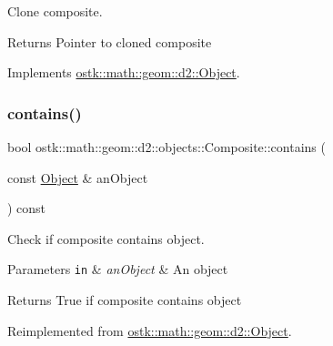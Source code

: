 Clone composite. 

\begin{DoxyReturn}{Returns}
Pointer to cloned composite 
\end{DoxyReturn}


Implements \hyperlink{classostk_1_1math_1_1geom_1_1d2_1_1_object_a98dedc6792aef35308966ca768eb3e14}{ostk\+::math\+::geom\+::d2\+::\+Object}.

\mbox{\label{classostk_1_1math_1_1geom_1_1d2_1_1objects_1_1_composite_a4a07c3111b7ca79b2e0d5ec2d52b2ef1}} 
\subsubsection{\texorpdfstring{contains()}{contains()}\hspace{0.1cm}{\footnotesize\ttfamily [1/2]}}
{\footnotesize\ttfamily bool ostk\+::math\+::geom\+::d2\+::objects\+::\+Composite\+::contains (\begin{DoxyParamCaption}\item[{const \hyperlink{classostk_1_1math_1_1geom_1_1d2_1_1_object}{Object} \&}]{an\+Object }\end{DoxyParamCaption}) const\hspace{0.3cm}{\ttfamily [virtual]}}



Check if composite contains object. 


\begin{DoxyParams}[1]{Parameters}
\mbox{\tt in}  & {\em an\+Object} & An object \\
\hline
\end{DoxyParams}
\begin{DoxyReturn}{Returns}
True if composite contains object 
\end{DoxyReturn}


Reimplemented from \hyperlink{classostk_1_1math_1_1geom_1_1d2_1_1_object_ad932da22ca5827ee461b822fffd413c1}{ostk\+::math\+::geom\+::d2\+::\+Object}.

\mbox{\label{classostk_1_1math_1_1geom_1_1d2_1_1objects_1_1_composite_a4c5eb2d8ca523cd03543a5d150d52784}} 
